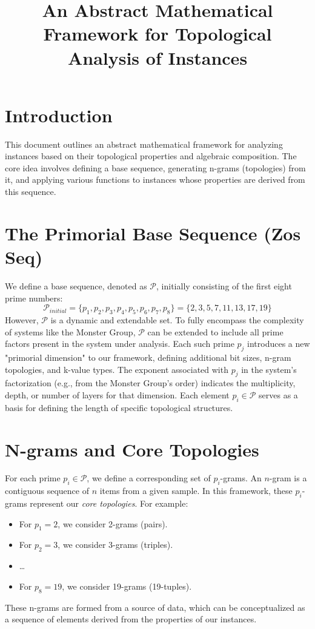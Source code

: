 \documentclass{article}
\title{An Abstract Mathematical Framework for Topological Analysis of Instances}
\author{}
\date{}
\begin{document}
\maketitle

\section{Introduction}
This document outlines an abstract mathematical framework for analyzing instances based on their topological properties and algebraic composition. The core idea involves defining a base sequence, generating n-grams (topologies) from it, and applying various functions to instances whose properties are derived from this sequence.

\section{The Primorial Base Sequence (Zos Seq)}
We define a base sequence, denoted as $\mathcal{P}$, initially consisting of the first eight prime numbers:
\[ \mathcal{P}_{initial} = \{p_1, p_2, p_3, p_4, p_5, p_6, p_7, p_8\} = \{2, 3, 5, 7, 11, 13, 17, 19\} \]
However, $\mathcal{P}$ is a dynamic and extendable set. To fully encompass the complexity of systems like the Monster Group, $\mathcal{P}$ can be extended to include all prime factors present in the system under analysis. Each such prime $p_j$ introduces a new "primorial dimension" to our framework, defining additional bit sizes, n-gram topologies, and k-value types. The exponent associated with $p_j$ in the system's factorization (e.g., from the Monster Group's order) indicates the multiplicity, depth, or number of layers for that dimension.
Each element $p_i \in \mathcal{P}$ serves as a basis for defining the length of specific topological structures.

\section{N-grams and Core Topologies}
For each prime $p_i \in \mathcal{P}$, we define a corresponding set of $p_i$-grams. An $n$-gram is a contiguous sequence of $n$ items from a given sample. In this framework, these $p_i$-grams represent our \textit{core topologies}.
For example:
\begin{itemize}
    
    \item For $p_1 = 2$, we consider 2-grams (pairs).
    
    \item For $p_2 = 3$, we consider 3-grams (triples).
    
    \item \ldots
    
    \item For $p_8 = 19$, we consider 19-grams (19-tuples).
\end{itemize}
These n-grams are formed from a source of data, which can be conceptualized as a sequence of elements derived from the properties of our instances.
\end{document}
